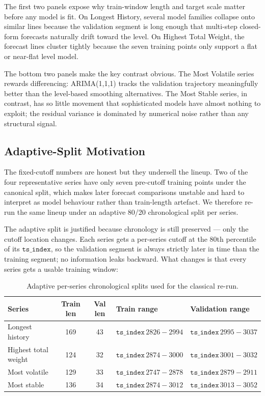 The first two panels expose why train-window length and target scale matter before any model is fit. On Longest History, several model families collapse onto similar lines because the validation segment is long enough that multi-step closed-form forecasts naturally drift toward the level. On Highest Total Weight, the forecast lines cluster tightly because the seven training points only support a flat or near-flat level model.

The bottom two panels make the key contrast obvious. The Most Volatile series rewards differencing: ARIMA(1,1,1) tracks the validation trajectory meaningfully better than the level-based smoothing alternatives. The Most Stable series, in contrast, has so little movement that sophisticated models have almost nothing to exploit; the residual variance is dominated by numerical noise rather than any structural signal.

\subsection{Adaptive-Split Motivation}
\label{sec:classical:adaptive_motivation}

The fixed-cutoff numbers are honest but they undersell the lineup. Two of the four representative series have only seven pre-cutoff training points under the canonical split, which makes later forecast comparisons unstable and hard to interpret as model behaviour rather than train-length artefact. We therefore re-run the same lineup under an adaptive 80/20 chronological split per series.

The adaptive split is justified because chronology is still preserved --- only the cutoff location changes. Each series gets a per-series cutoff at the 80th percentile of its $\mathtt{ts\_index}$, so the validation segment is always strictly later in time than the training segment; no information leaks backward. What changes is that every series gets a usable training window:

\begin{table}[h]
\centering
\caption{Adaptive per-series chronological splits used for the classical re-run.}
\label{tab:classical_splits_adaptive}
\begin{tabular}{l c c l l}
\toprule
Series & Train len & Val len & Train range & Validation range \\
\midrule
Longest history       & 169 & 43 & $\mathtt{ts\_index}\,2826{-}2994$ & $\mathtt{ts\_index}\,2995{-}3037$ \\
Highest total weight  & 124 & 32 & $\mathtt{ts\_index}\,2874{-}3000$ & $\mathtt{ts\_index}\,3001{-}3032$ \\
Most volatile         & 129 & 33 & $\mathtt{ts\_index}\,2747{-}2878$ & $\mathtt{ts\_index}\,2879{-}2911$ \\
Most stable           & 136 & 34 & $\mathtt{ts\_index}\,2874{-}3012$ & $\mathtt{ts\_index}\,3013{-}3052$ \\
\bottomrule
\end{tabular}
\end{table}

